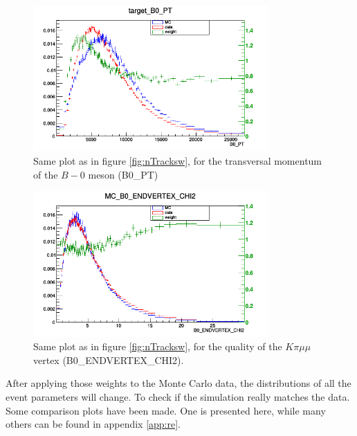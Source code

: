 \documentclass[english]{uzhpub}
\begin{document}
\begin{figure}[H]
\centering
\includegraphics[width=0.8\textwidth]{Reweighting/B0_PTw}
\caption{Same plot as in figure \ref{fig:nTracksw}, for the transversal momentum of the $B-0$ meson (B0\_PT)}
\label{fig:B0_PTw}
\end{figure}

\begin{figure}[H]
\centering
\includegraphics[width=0.8\textwidth]{Reweighting/B0_ENDVERTEX_CHI2w}
\caption{Same plot as in figure \ref{fig:nTracksw}, for the quality of the $K \pi \mu \mu$ vertex (B0\_ENDVERTEX\_CHI2).}
\label{fig:B0_ENDVERTEX_CHI2w}
\end{figure}

After applying those weights to the Monte Carlo data, the distributions of all the event parameters will change. To check if the simulation really matches the data. Some comparison plots have been made. One is presented here, while many others can be found in appendix \ref{app:re}.
\end{document}
